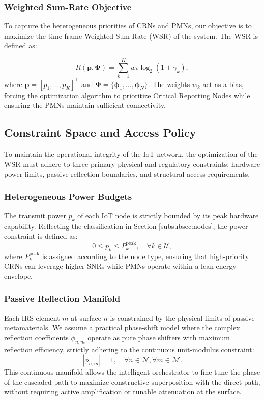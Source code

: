 \documentclass[journal]{IEEEtran}
\newcommand{\trans}{^{\mathsf{T}}}
\begin{document}
\subsubsection{Weighted Sum-Rate Objective}
\label{subsubsec:wsr}
To capture the heterogeneous priorities of CRNs and PMNs, our objective is to maximize the time-frame Weighted Sum-Rate (WSR) of the system. The WSR is defined as:

\begin{equation}
    R(\mathbf{p}, \boldsymbol{\Phi}) = \sum_{k=1}^{K} w_k \log_2(1 + \gamma_k),
\end{equation}
where $\mathbf{p} = [p_1, \dots, p_K]\trans$ and $\boldsymbol{\Phi} = \{\boldsymbol{\phi}_1, \dots, \boldsymbol{\phi}_N\}$. The weights $w_k$ act as a bias, forcing the optimization algorithm to prioritize Critical Reporting Nodes while ensuring the PMNs maintain sufficient connectivity.

\subsection{Constraint Space and Access Policy}
\label{subsec:constraints}

To maintain the operational integrity of the IoT network, the optimization of the WSR must adhere to three primary physical and regulatory constraints: hardware power limits, passive reflection boundaries, and structural access requirements.

\subsubsection{Heterogeneous Power Budgets}
The transmit power $p_k$ of each IoT node is strictly bounded by its peak hardware capability. Reflecting the classification in Section \ref{subsubsec:nodes}, the power constraint is defined as:
\begin{equation}
    0 \le p_k \le P_k^{\text{peak}}, \quad \forall k \in \mathcal{U},
\end{equation}
where $P_k^{\text{peak}}$ is assigned according to the node type, ensuring that high-priority CRNs can leverage higher SNRs while PMNs operate within a lean energy envelope.

\subsubsection{Passive Reflection Manifold}
Each IRS element $m$ at surface $n$ is constrained by the physical limits of passive metamaterials. We assume a practical phase-shift model where the complex reflection coefficients $\phi_{n,m}$ operate as pure phase shifters with maximum reflection efficiency, strictly adhering to the continuous unit-modulus constraint:
\begin{equation}
    |\phi_{n,m}| = 1, \quad \forall n \in \mathcal{N}, \forall m \in \mathcal{M}.
\end{equation}
This continuous manifold allows the intelligent orchestrator to fine-tune the phase of the cascaded path to maximize constructive superposition with the direct path, without requiring active amplification or tunable attenuation at the surface.
\end{document}
